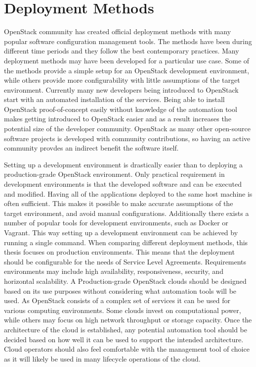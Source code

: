 \section{Deployment Methods}

OpenStack community has created  official deployment methods with many popular
software configuration management tools. The methods have been during different
time periods and they follow the best contemporary practices. Many deployment
methods may have been developed for a particular use case. Some of the methods
provide a simple setup for an OpenStack development environment, while others
provide more configurability with little assumptions of the target environment.
Currently many new developers being introduced to OpenStack start with an
automated installation of the services. Being able to install OpenStack
proof-of-concept easily without knowledge of the automation tool makes getting
introduced to OpenStack easier and as a result increases the potential size of
the developer community. OpenStack as many other open-source software projects
is developed with community contributions, so having an active community
provdes an indirect benefit the software itself.

Setting up a development environment is drastically easier than to deploying a
production-grade OpenStack environment. Only practical requirement in
development environments is that the developed software and can be executed and
modified. Having all of the applications deployed to the same host machine is
often sufficient. This makes it possible to make accurate assumptions of the
target environment, and avoid manual configurations. Additionally there exists
a number of popular tools for development environments, such as Docker
or Vagrant. This way setting up a development environment can be achieved by
running a single command. When comparing different deployment methods, this
thesis focuses on production environments. This means that the deployment
should be configurable for the needs of Service Level Agreements. Requirements
environments may include high availability, responsiveness, security, and
horizontal scalability. A Production-grade OpenStack clouds should be designed
based on its use purposes without considering what automation tools will be
used. As OpenStack consists of a complex set of services it can be used for
various computing environments. Some clouds invest on computational power,
while others may focus on high network throughput or storage capacity. Once the
architecture of the cloud is established, any potential automation tool should
be decided based on how well it can be used to support the intended
architecture. Cloud operators should also feel comfortable with the management
tool of choice as it will likely be used in many lifecycle operations of the
cloud.

